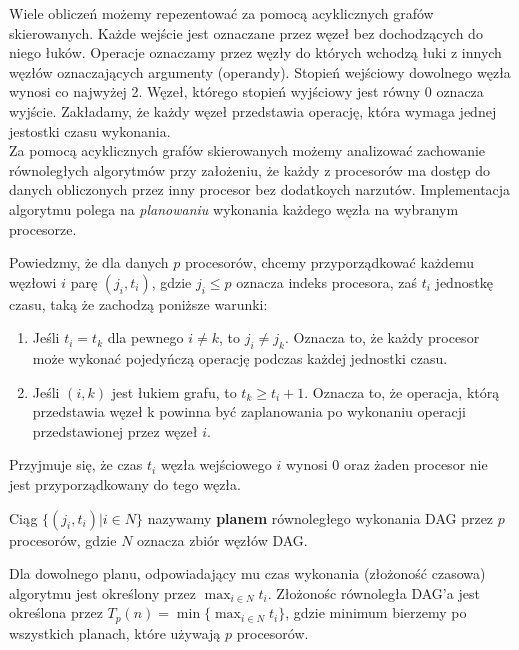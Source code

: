 Wiele obliczeń możemy repezentować za pomocą acyklicznych grafów skierowanych. Każde wejście jest oznaczane przez węzeł bez dochodzących do niego łuków. Operacje oznaczamy przez węzły do których wchodzą łuki z innych węzłów oznaczających argumenty (operandy). Stopień wejściowy dowolnego węzła wynosi co najwyżej 2. Węzeł, którego stopień wyjściowy jest równy 0 oznacza wyjście. Zakładamy, że każdy węzeł przedstawia operację, która wymaga jednej jestostki czasu wykonania.\\



Za pomocą acyklicznych grafów skierowanych możemy analizować zachowanie równoległych algorytmów przy założeniu, że każdy z procesorów ma dostęp do danych obliczonych przez inny procesor bez dodatkoych narzutów. Implementacja algorytmu polega na \emph{planowaniu} wykonania każdego węzła na wybranym procesorze.

Powiedzmy, że dla danych \(p\) procesorów, chcemy przyporządkować każdemu węzłowi \(i\) parę \((j_i, t_i)\), gdzie \(j_i \leq p\) oznacza indeks procesora, zaś \(t_i\) jednostkę czasu, taką że zachodzą poniższe warunki:
\begin{enumerate}
\item Jeśli \(t_i=t_k\) dla pewnego \(i\neq k\), to \(j_i\neq j_k\). Oznacza to, że każdy procesor może wykonać pojedyńczą operację podczas każdej jednostki czasu.
\item Jeśli \((i, k)\) jest łukiem grafu, to \(t_k\geq t_i + 1\). Oznacza to, że operacja, którą przedstawia węzeł k powinna być zaplanowania po wykonaniu operacji przedstawionej przez węzeł \(i\).
\end{enumerate}

Przyjmuje się, że czas \(t_i\) węzła wejściowego \(i\) wynosi 0 oraz żaden procesor nie jest przyporządkowany do tego węzła.\\
\begin{definicja}[Plan]\label{def:plan}
Ciąg \(\{(j_i, t_i) | i\in N\}\) nazywamy \textbf{planem} równoległego wykonania DAG przez \(p\) procesorów, gdzie \(N\) oznacza zbiór węzłów DAG.
\end{definicja}
Dla dowolnego planu, odpowiadający mu czas wykonania (złożoność czasowa) algorytmu jest określony przez \(\max_{i\in N}t_i\). Złożonośc równoległa DAG'a jest określona przez \(T_{p}(n) = \min{\{\max_{i\in N}t_i\}}\), gdzie minimum bierzemy po wszystkich planach, które używają \(p\) procesorów.


